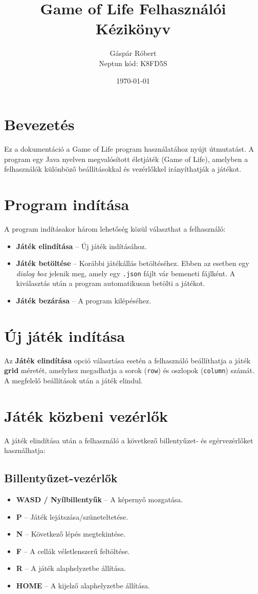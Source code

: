 \documentclass[a4paper,12pt]{article}
\title{Game of Life Felhasználói Kézikönyv}
\author{Gáspár Róbert \\ Neptun kód: K8FD5S}
\date{\today}
\begin{document}
\maketitle

\section*{Bevezetés}
Ez a dokumentáció a Game of Life program használatához nyújt útmutatást. A program egy Java nyelven megvalósított életjáték (Game of Life), amelyben a felhasználók különböző beállításokkal és vezérlőkkel irányíthatják a játékot.

\section*{Program indítása}
A program indításakor három lehetőség közül választhat a felhasználó:
\begin{itemize}
    \item \textbf{Játék elindítása} – Új játék indításához.
    \item \textbf{Játék betöltése} – Korábbi játékállás betöltéséhez. Ebben az esetben egy \textit{dialog box} jelenik meg, amely egy \texttt{.json} fájlt vár bemeneti fájlként. A kiválasztás után a program automatikusan betölti a játékot.
    \item \textbf{Játék bezárása} – A program kilépéséhez.
\end{itemize}

\section*{Új játék indítása}
Az \textbf{Játék elindítása} opció választása esetén a felhasználó beállíthatja a játék \textbf{grid} méretét, amelyhez megadhatja a sorok (\texttt{row}) és oszlopok (\texttt{column}) számát. A megfelelő beállítások után a játék elindul.

\newpage
\section*{Játék közbeni vezérlők}
A játék elindítása után a felhasználó a következő billentyűzet- és egérvezérlőket használhatja:

\subsection*{Billentyűzet-vezérlők}
\begin{itemize}
    \item \textbf{WASD / Nyílbillentyűk} – A képernyő mozgatása.
    \item \textbf{P} – Játék lejátszása/szüneteltetése.
    \item \textbf{N} – Következő lépés megtekintése.
    \item \textbf{F} – A cellák véletlenszerű feltöltése.
    \item \textbf{R} – A játék alaphelyzetbe állítása.
    \item \textbf{HOME} – A kijelző alaphelyzetbe állítása.
\end{itemize}
\end{document}
